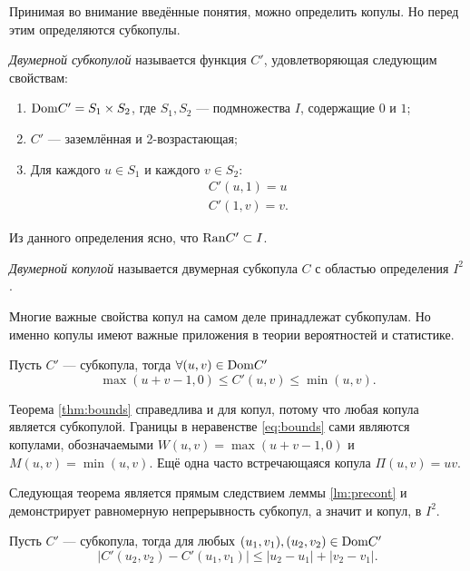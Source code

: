 Принимая во внимание введённые понятия, можно определить копулы. Но перед этим определяются субкопулы\cite{Nelsen1999}.

\begin{define}
	\emph{Двумерной субкопулой} называется функция $C'$, удовлетворяющая следующим свойствам:
	\begin{enumerate}
	\item $\mathrm{Dom}{C'} = S_1 \times S_2$, где $S_1, S_2$ --- подмножества $I$, содержащие $0$ и $1$;
	\item $C'$ --- заземлённая и 2-возрастающая;
	\item Для каждого $u \in S_1$ и каждого $v \in S_2$:
		\begin{gather}
			C'(u, 1) = u \\
			C'(1, v) = v.
		\end{gather}
	\end{enumerate}
\end{define}

Из данного определения ясно, что $\mathrm{Ran}{C'} \subset I$.

\begin{define}
	\emph{Двумерной копулой} называется двумерная субкопула $C$ с областью определения $I^2$.
\end{define}

Многие важные свойства копул на самом деле принадлежат субкопулам. Но именно копулы имеют важные приложения в теории вероятностей и статистике.

\begin{theorem}\label{thm:bounds}
	Пусть $C'$ --- субкопула, тогда $\forall (u, v) \in \mathrm{Dom}{C'}$
	\begin{equation}\label{eq:bounds}
		\max (u + v - 1, 0) \leqslant C'(u, v) \leqslant \min (u, v).
	\end{equation}
\end{theorem}

Теорема \ref{thm:bounds} справедлива и для копул, потому что любая копула является субкопулой. Границы в неравенстве \eqref{eq:bounds} сами являются копулами, обозначаемыми $W(u, v) = \max (u + v - 1, 0)$ и $M(u, v) = \min (u, v)$. Ещё одна часто встречающаяся копула $\Pi(u, v) = uv$.

Следующая теорема является прямым следствием леммы \ref{lm:precont} и демонстрирует равномерную непрерывность субкопул, а значит и копул, в $I^2$.

\begin{theorem}\label{thm:cont}
	Пусть $C'$ --- субкопула, тогда для любых $(u_1, v_1), (u_2, v_2) \in \mathrm{Dom}{C'}$
\[
|C'(u_2, v_2) - C'(u_1, v_1)| \leqslant |u_2 - u_1| + |v_2 - v_1|.
\]
\end{theorem}

